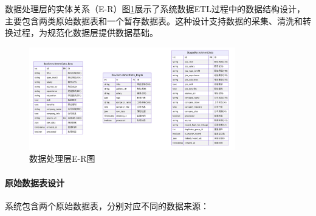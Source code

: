 

数据处理层的实体关系（E-R）图\ref{fig:processing_er}展示了系统数据ETL过程中的数据结构设计，主要包含两类原始数据表和一个暂存数据表。这种设计支持数据的采集、清洗和转换过程，为规范化数据层提供数据基础。

\begin{figure}[htbp]
  \centering
  \includegraphics[width=0.8\textwidth]{figures/数据处理层ER图.png}
  \caption{数据处理层E-R图}
  \label{fig:processing_er}
\end{figure}

\paragraph{原始数据表设计}
系统包含两个原始数据表，分别对应不同的数据来源：

